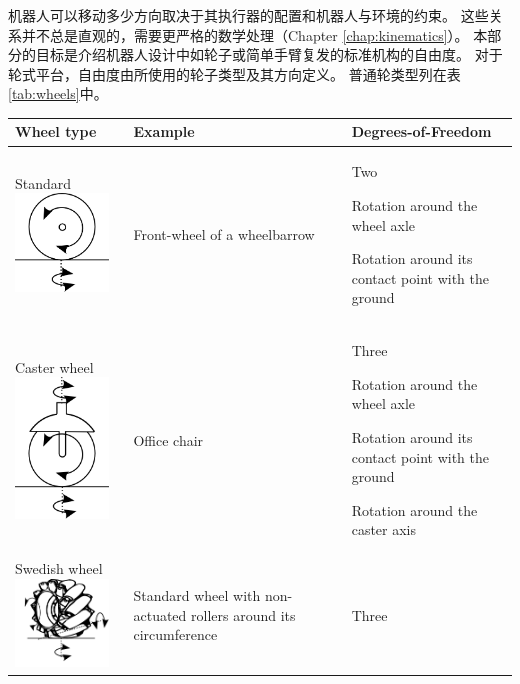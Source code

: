 机器人可以移动多少方向取决于其执行器的配置和机器人与环境的约束。 这些关系并不总是直观的，需要更严格的数学处理（Chapter \ref{chap:kinematics}）。 本部分的目标是介绍机器人设计中如轮子或简单手臂复发的标准机构的自由度。 对于轮式平台，自由度由所使用的轮子类型及其方向定义。 普通轮类型列在表\ref{tab:wheels}中。

\begin{table}
\begin{tabular}{p{2.8cm}p{3cm}p{4cm}}
\hline
Wheel type & Example & Degrees-of-Freedom\\
\hline
Standard \includegraphics[width=2.5cm]{figs/wheeltype_standard.png} &	Front-wheel of a wheelbarrow	& Two
\begin{compactitem}
\item Rotation around the wheel axle
\item Rotation around its contact point with the ground
\end{compactitem}\\
\hline
Caster wheel	\includegraphics[width=2.5cm]{figs/wheeltype_caster.png}& Office chair & Three
\begin{compactitem}
\item Rotation around the wheel axle
\item Rotation around its contact point with the ground
\item Rotation around the caster axis
\end{compactitem}\\
\hline
Swedish wheel \includegraphics[width=2.5cm]{figs/wheeltype_swedish.png}& Standard wheel with non-actuated rollers around its circumference& Three

\end{tabular}
\end{table}
